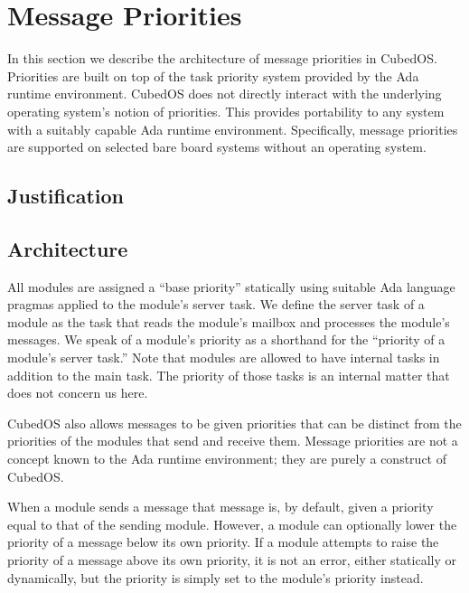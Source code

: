 
\section{Message Priorities}
\label{section-message-priorities}

In this section we describe the architecture of message priorities in CubedOS. Priorities are
built on top of the task priority system provided by the Ada runtime environment. CubedOS does
not directly interact with the underlying operating system's notion of priorities. This provides
portability to any system with a suitably capable Ada runtime environment. Specifically, message
priorities are supported on selected bare board systems without an operating system.

\subsection{Justification}


\subsection{Architecture}

All modules are assigned a ``base priority'' statically using suitable Ada language pragmas
applied to the module's server task. We define the server task of a module as the task that
reads the module's mailbox and processes the module's messages. We speak of a module's priority
as a shorthand for the ``priority of a module's server task.'' Note that modules are allowed to
have internal tasks in addition to the main task. The priority of those tasks is an internal
matter that does not concern us here.

CubedOS also allows messages to be given priorities that can be distinct from the priorities of
the modules that send and receive them. Message priorities are not a concept known to the Ada
runtime environment; they are purely a construct of CubedOS.

When a module sends a message that message is, by default, given a priority equal to that of the
sending module. However, a module can optionally lower the priority of a message below its own
priority. If a module attempts to raise the priority of a message above its own priority, it is
not an error, either statically or dynamically, but the priority is simply set to the module's
priority instead. 

